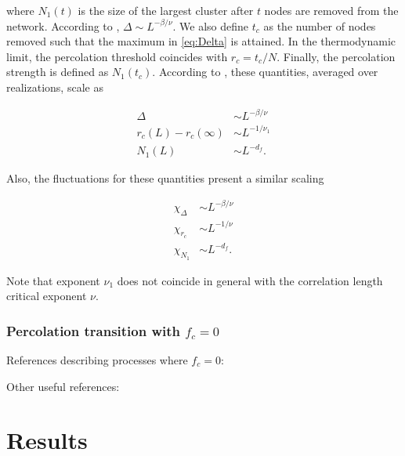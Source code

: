 \documentclass{article}
\begin{document}
where $N_1(t)$ is the size of the largest cluster after $t$ nodes are removed from the network. According to \cite{Fan2020}, $\Delta\sim L^{-\beta/\nu}$. We also define $t_c$ as the number of nodes removed such that the maximum in \ref{eq:Delta} is attained. In the thermodynamic limit, the percolation threshold coincides with $r_c = t_c/N$. Finally, the percolation strength is defined as $N_1(t_c)$. According to \cite{Fan2020}, these quantities, averaged over realizations, scale as 

\begin{align}
\Delta&\sim L^{-\beta/\nu} \label{eq:fan_Delta}\\
r_c(L) - r_c(\infty) &\sim L^{-1/\nu_1} \label{eq:fan_rc}\\
N_1(L) &\sim L^{-d_f}. \label{eq:fan_N1}
\end{align}

Also, the fluctuations for these quantities present a similar scaling 

\begin{align}
\chi_{\Delta} &\sim L^{-\beta/\nu} \label{eq:fan_chiDelta} \\
\chi_{r_c} &\sim L^{-1/\nu} \label{eq:fan_chirc}\\
\chi_{N_1} &\sim L^{-d_f}. \label{eq:fan_chiN1}
\end{align}

Note that exponent $\nu_1$ does not coincide in general with the correlation length critical exponent $\nu$.

\subsubsection{Percolation transition with $f_c = 0$}

References describing processes where $f_c = 0$: \cite{Rozenfeld2010Small-worldApproach,Trevelyan2018DegreeInformation,Cho2013AvoidingModels}

Other useful references: \cite{Boettcher2012,Trevelyan2018DegreeInformation,Cho2010}

\section{Results}

\end{document}
